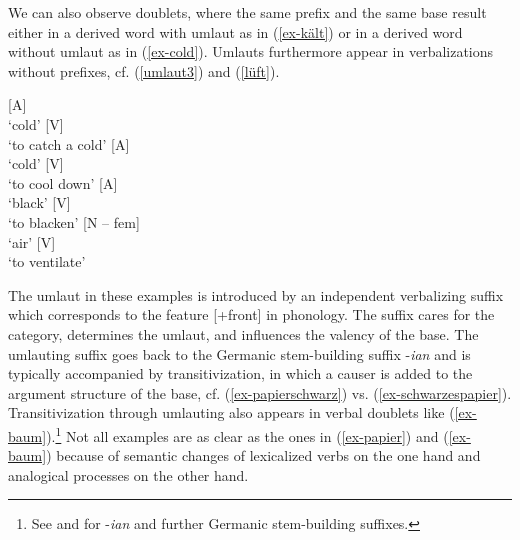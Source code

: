 \documentclass[output=paper
  ,nobabel
  ,draftmode
  ,colorlinks, citecolor=brown
]{langscibook}
\begin{document}
\noindent We can also observe doublets, where the same prefix and the same base result either in a derived word with umlaut as in (\ref{ex-kält}) or in a derived word without umlaut as in (\ref{ex-cold}). Umlauts furthermore appear in verbalizations without prefixes, cf. (\ref{umlaut3}) and (\ref{lüft}).

\begin{exe}
\ex
  \begin{xlist}
\label{ex-kält}
\ex {} {}[A{}]\\`cold'
\ex {} {}[V{}]\\`to catch a cold'
\zl
\eal
\label{ex-cold}
\ex {} {}[A{}]\\`cold'
\ex {} {}[V{}]\\`to cool down' 
\zl
\eal
\label{umlaut3}
\ex\label{schwärz} {}[A{}]\\`black'
\ex {} {}[V{}]\\`to blacken'
\zl
\eal
\label{lüft}
\ex{} {}[N -- fem{}]\\`air'
\ex{} {}[V{}]\\`to ventilate'
\end{xlist}
\end{exe}


\noindent 
The umlaut in these examples is introduced by an independent verbalizing suffix which corresponds to the feature [+front] in phonology. The suffix cares for the category, determines the umlaut, and influences the valency of the base. The umlauting suffix goes back to the Germanic stem-building suffix -\emph{ian} and is typically accompanied by transitivization, in which a causer is added to the argument structure of the base, cf. (\ref{ex-papierschwarz}) vs. (\ref{ex-schwarzespapier}). Transitivization through umlauting also appears in verbal doublets like (\ref{ex-baum}).\footnote{See \textcites[90--93]{Sonderegger1997}[Section~5.3.7]{Sonderegger2003} and  for -\emph{ian} and further Germanic stem-building suffixes.} Not all examples are as clear as the ones in (\ref{ex-papier}) and (\ref{ex-baum}) because of semantic changes of lexicalized verbs on the one hand and analogical processes on the other hand.
\end{document}
